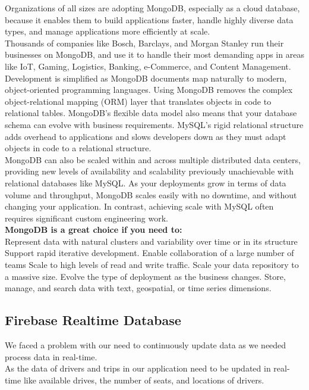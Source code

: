 Organizations of all sizes are adopting MongoDB, especially as a cloud database, because it enables them to build applications faster, handle highly diverse data types, and manage applications more efficiently at scale.\\
Thousands of companies like Bosch, Barclays, and Morgan Stanley run their businesses on MongoDB, and use it to handle their most demanding apps in areas like IoT, Gaming, Logistics, Banking, e-Commerce, and Content Management.\\

Development is simplified as MongoDB documents map naturally to modern, object-oriented programming languages. Using MongoDB removes the complex object-relational mapping (ORM) layer that translates objects in code to relational tables. MongoDB’s flexible data model also means that your database schema can evolve with business requirements. MySQL's rigid relational structure adds overhead to applications and slows developers down as they must adapt objects in code to a relational structure.\\

MongoDB can also be scaled within and across multiple distributed data centers, providing new levels of availability and scalability previously unachievable with relational databases like MySQL. As your deployments grow in terms of data volume and throughput, MongoDB scales easily with no downtime, and without changing your application. In contrast, achieving scale with MySQL often requires significant custom engineering work.\\

\textbf{MongoDB is a great choice if you need to:}\\
Represent data with natural clusters and variability over time or in its structure
Support rapid iterative development.
Enable collaboration of a large number of teams
Scale to high levels of read and write traffic.
Scale your data repository to a massive size.
Evolve the type of deployment as the business changes.
Store, manage, and search data with text, geospatial, or time series dimensions.\cite{AF3}

\subsection{Firebase Realtime Database}

\hspace{2cm}We faced a problem with our need to continuously update data as we needed process data in real-time.\\
As the data of drivers and trips in our application need to be updated in real-time like available drives, the number of seats, and locations of drivers.

